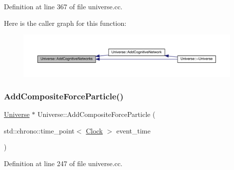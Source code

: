 Definition at line 367 of file universe.\+cc.

Here is the caller graph for this function\+:
\nopagebreak
\begin{figure}[H]
\begin{center}
\leavevmode
\includegraphics[width=350pt]{class_universe_a5199f6c27b1a97c8b8c9847b8be686cf_icgraph}
\end{center}
\end{figure}
\mbox{\label{class_universe_ab2671c2218c98f0f1f487c5b3bb96e3c}} 
\subsubsection{\texorpdfstring{Add\+Composite\+Force\+Particle()}{AddCompositeForceParticle()}}
{\footnotesize\ttfamily \hyperlink{class_universe}{Universe} $\ast$ Universe\+::\+Add\+Composite\+Force\+Particle (\begin{DoxyParamCaption}\item[{std\+::chrono\+::time\+\_\+point$<$ \hyperlink{universe_8h_a0ef8d951d1ca5ab3cfaf7ab4c7a6fd80}{Clock} $>$}]{event\+\_\+time }\end{DoxyParamCaption})}



Definition at line 247 of file universe.\+cc.

